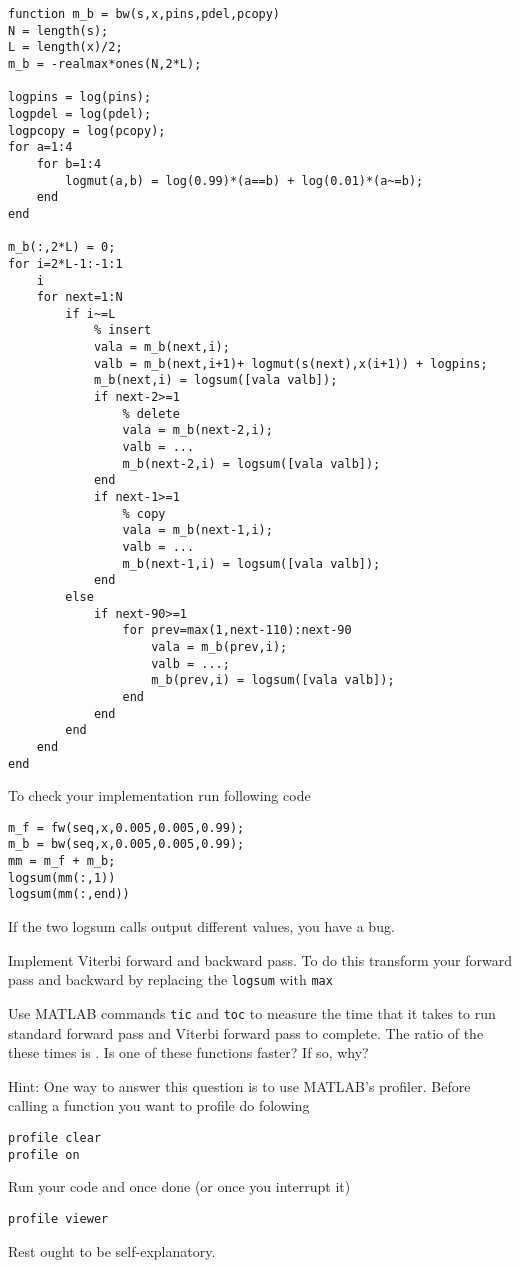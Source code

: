 \documentclass{article}
\begin{document}
\begin{verbatim}
function m_b = bw(s,x,pins,pdel,pcopy)
N = length(s);
L = length(x)/2;
m_b = -realmax*ones(N,2*L);

logpins = log(pins);
logpdel = log(pdel);
logpcopy = log(pcopy);
for a=1:4
    for b=1:4
        logmut(a,b) = log(0.99)*(a==b) + log(0.01)*(a~=b);
    end
end

m_b(:,2*L) = 0;
for i=2*L-1:-1:1
    i
    for next=1:N
        if i~=L
            % insert
            vala = m_b(next,i);
            valb = m_b(next,i+1)+ logmut(s(next),x(i+1)) + logpins;
            m_b(next,i) = logsum([vala valb]);
            if next-2>=1
                % delete
                vala = m_b(next-2,i);
                valb = ...
                m_b(next-2,i) = logsum([vala valb]);
            end
            if next-1>=1
                % copy
                vala = m_b(next-1,i);
                valb = ...
                m_b(next-1,i) = logsum([vala valb]);
            end
        else
            if next-90>=1
                for prev=max(1,next-110):next-90
                    vala = m_b(prev,i);
                    valb = ...;
                    m_b(prev,i) = logsum([vala valb]);
                end
            end
        end
    end
end
\end{verbatim}
To check your implementation run following code
\begin{verbatim}
m_f = fw(seq,x,0.005,0.005,0.99);
m_b = bw(seq,x,0.005,0.005,0.99);
mm = m_f + m_b;
logsum(mm(:,1))
logsum(mm(:,end))
\end{verbatim}
If the two logsum calls output different values, you have a bug.

\newproblem{3pt} Implement Viterbi forward and backward pass. To do this transform your forward pass and backward by replacing the {\tt logsum} with {\tt max}

\newproblem{2pt} Use MATLAB commands {\tt tic} and {\tt toc} to measure the time that it takes to run standard forward pass and Viterbi forward pass to complete. The ratio of the these times is \answer. Is one of these functions faster? If so, why?

Hint: One way to answer this question is to use MATLAB's profiler. Before calling a function you want to profile do folowing
\begin{verbatim}
profile clear
profile on
\end{verbatim}
Run your code and once done (or once you interrupt it)
\begin{verbatim}
profile viewer
\end{verbatim}
Rest ought to be self-explanatory.
\end{document}
